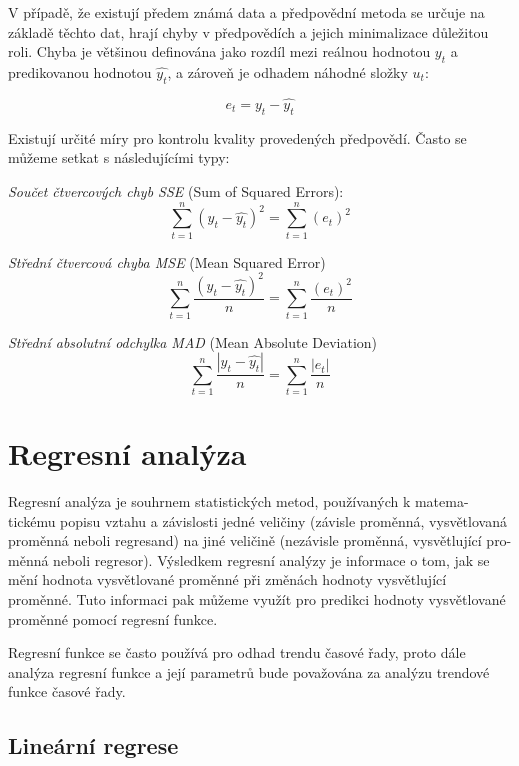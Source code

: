 \documentclass[a4paper,12pt,twoside]{scrreprt}
\begin{document}
V případě, že existují předem známá data a předpovědní metoda se určuje na základě těchto dat, hrají chyby v předpovědích a jejich minimalizace důležitou roli. Chyba je většinou definována jako rozdíl mezi reálnou hodnotou $y_t$ a predikovanou hodnotou $\hat{y_t}$, a zároveň je odhadem náhodné složky $u_t$:

\begin{equation}
e_t = y_t - \hat{y_t}
\end{equation}

Existují určité míry pro kontrolu kvality provedených předpovědí. Často se můžeme setkat s následujícími typy: 

\textit{Součet čtvercových chyb SSE} (Sum of Squared Errors):
\begin{equation}
\sum_{t=1}^{n}(y_t - \hat{y_t})^2 = \sum_{t=1}^{n}(e_t)^2
\end{equation}

\textit{Střední čtvercová chyba MSE} (Mean Squared Error)
\begin{equation}
\sum_{t=1}^{n}\frac{(y_t - \hat{y_t})^2}{n} = \sum_{t=1}^{n}\frac{(e_t)^2}{n}
\end{equation}

\textit{Střední absolutní odchylka MAD} (Mean Absolute Deviation)
\begin{equation}
\sum_{t=1}^{n}\frac{|y_t - \hat{y_t}|}{n} = \sum_{t=1}^{n}\frac{|e_t|}{n}
\end{equation}

\newpage
\section{Regresní analýza}
\vspace{0.5cm}

Regresní analýza je souhrnem statistických metod, používaných k matema-tickému popisu vztahu a závislosti jedné veličiny (závisle proměnná, vysvětlovaná proměnná neboli regresand) na jiné veličině (nezávisle proměnná, vysvětlující pro-měnná neboli regresor). Výsledkem regresní analýzy je informace o tom, jak se mění hodnota vysvětlované proměnné při změnách hodnoty vysvětlující proměnné. Tuto informaci pak můžeme využít pro predikci hodnoty vysvětlované proměnné pomocí regresní funkce. 

Regresní funkce se často používá pro odhad trendu časové řady, proto dále analýza regresní funkce a její parametrů bude považována za analýzu trendové funkce časové řady.

\subsection{Lineární regrese}
\end{document}
